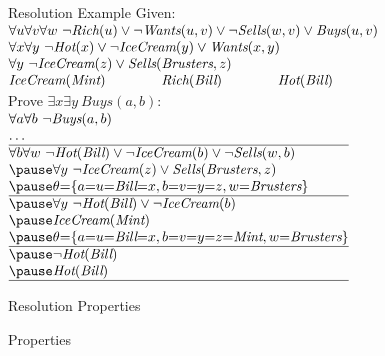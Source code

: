 \documentclass[14pt]{beamer}
\begin{document}
\begin{frame}[label=resolution-example-2]{Resolution Example}
\small
Given:\\
\tab$
\begin{array}{ @{} l @{\hspace{4em}} l @{\hspace{4em}} l @{} }
\lefteqn{\forall u \forall v \forall w\ \lnot\textit{Rich}(u) \lor \lnot\textit{Wants}(u, v) \lor \lnot\textit{Sells}(w, v) \lor \textit{Buys}(u, v)} \\
\lefteqn{\forall x \forall y\ \lnot\textit{Hot}(x) \lor \lnot\textit{IceCream}(y) \lor \textit{Wants}(x, y)} \\
\lefteqn{\forall y\ \lnot\textit{IceCream}(z) \lor \textit{Sells}(\textit{Brusters}, z)} \\
\textit{IceCream}(\textit{Mint})
& \textit{Rich}(\textit{Bill})
& \textit{Hot}(\textit{Bill})
\end{array}
$
\\[0.5em]
Prove $\exists x \exists y\ \textit{Buys}(a, b)$:\\
\tab$\thickmuskip=0mu
\begin{array}{ @{} l @{} }
\forall a \forall b\ \lnot\textit{Buys}(a, b) \\
\ldots\\
\hline
\forall b \forall w\ \lnot\textit{Hot}(\textit{Bill}) \lor \lnot\textit{IceCream}(b) \lor \lnot\textit{Sells}(w, b) \\
\pause
\forall y\ \lnot\textit{IceCream}(z) \lor \textit{Sells}(\textit{Brusters}, z) \\
\pause
\theta = \{ a=u=\textit{Bill}=x, b=v=y=z, w=\textit{Brusters} \} \\
\hline
\pause
\forall y\ \lnot\textit{Hot}(\textit{Bill}) \lor \lnot\textit{IceCream}(b) \\
\pause
\textit{IceCream}(\textit{Mint}) \\
\pause
\theta = \{ a=u=\textit{Bill}=x, b=v=y=z=\textit{Mint}, w=\textit{Brusters} \} \\
\hline
\pause
\lnot\textit{Hot}(\textit{Bill}) \\
\pause
\textit{Hot}(\textit{Bill}) \\
\hline
\end{array}
$
\end{frame}

\begin{frame}{Resolution Properties}
\begin{block}{Properties}
\begin{description}[Complete?]
\item[Sound?]
\item[Complete?]
\end{description}
\bigskip
{}
\end{block}
\end{frame}
\end{document}
